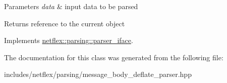 \begin{DoxyParams}{Parameters}
{\em data} & input data to be parsed \\
\hline
\end{DoxyParams}
\begin{DoxyReturn}{Returns}
reference to the current object 
\end{DoxyReturn}


Implements \hyperlink{classnetflex_1_1parsing_1_1parser__iface_a6b092567e70a5c0bf7568e94d06f7154}{netflex\+::parsing\+::parser\+\_\+iface}.



The documentation for this class was generated from the following file\+:\begin{DoxyCompactItemize}
\item 
includes/netflex/parsing/message\+\_\+body\+\_\+deflate\+\_\+parser.\+hpp\end{DoxyCompactItemize}

